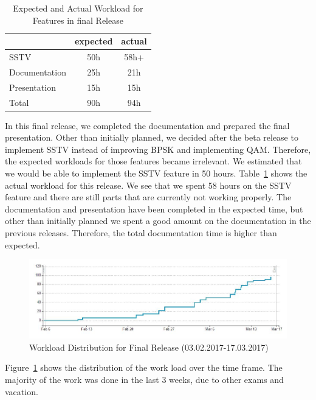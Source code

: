 \begin{table}
	\centering
	\caption{Expected and Actual Workload for Features in final Release}
	\label{tab:final:features}
	\begin{tabular}{ l | c | c }
		& expected  & actual \\ \hline
		SSTV & 50h & 58h+ \\  \hline
		Documentation & 25h & 21h \\ \hline \hline
		Presentation & 15h & 15h \\ \hline \hline 
		Total & 90h & 94h  
	\end{tabular}
\end{table}


In this final release, we completed the documentation and prepared the final presentation. Other than initially planned, we decided after the beta release to implement \ac{SSTV} instead of improving \ac{BPSK} and implementing \ac{QAM}. Therefore, the expected workloads for those features became irrelevant. We estimated that we would be able to implement the SSTV feature in 50 hours. Table~\ref{tab:final:features} shows the actual workload for this release. We see that we spent 58 hours on the SSTV feature and there are still parts that are currently not working properly. The documentation and presentation have been completed in the expected time, but other than initially planned we spent a good amount on the documentation in the previous releases. Therefore, the total documentation time is higher than expected. 

\begin{figure}
	\centering
	\includegraphics[width=1\linewidth]{gfx/Agilefant_Final.jpg}
	\caption{Workload Distribution for Final Release (03.02.2017-17.03.2017)}
	\label{fig:agilefant_final}
\end{figure}

Figure~\ref{fig:agilefant_final} shows the distribution of the work load over the time frame. The majority of the work was done in the last 3 weeks, due to other exams and vacation. 
